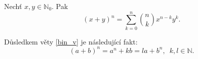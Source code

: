 \begin{veta}\label{bin_v}
  Nechť $x,y \in \mathbb N_0$. Pak
  $$(x+y)^n=\sum_{k=0}^n \binom{n}{k}x^{n-k}y^k.$$
\end{veta}

\begin{dusledek}
  Důsledkem věty \ref{bin_v} je následující fakt:
  \[
    (a+b)^n=a^n+kb=la+b^n,\,\,\, k,l\in \mathbb N.
  \]
\end{dusledek}

\begin{comment}


\begin{example}[SÚM 140/272]
  Dokažte, že platí vztah $n=\displaystyle\frac{ab}{d},$ kde $a,b\in \mathbb N$ a $d = D(a,b),$ $n=n(a,b).$
  \rm
  \begin{equation*}
    n=\displaystyle\frac{ab}{d}\iff nd=ab
  \end{equation*}
  Označme $a=da^\prime, b=db^\prime,$ kde $D(a^\prime, b^\prime)=1$. Pak
  \[
    ab=da^\prime b^\prime = d(a^\prime b^\prime d) = dn.
  \]
\end{example}


\begin{example}[SÚM 141/273]
  Nejmenší společný násobek čísla 21900 a trojciferného čísla $x$ je 13140. Určete číslo $x$.

  \rm
  Označme $a=2190=da^\prime$, $x=dx^\prime$ je hledané trojciferné číslo a $d = D(a,x),$ navíc platí $D(a^\prime,x^\prime)=1.$ Potom platí
  \begin{align*}
     ax&=nd \\
     a^\prime dx^\prime d &= nd\\
    n&=da^\prime x ^\prime = 13140 \implies x ^\prime= \displaystyle\frac{13140}{2190}=6 \\
    a^\prime d & = 2190
  \end{align*}
  Rozložme číslo 2190 na součin prvočinitelů.
  \[
    2190=2\cdot 3 \cdot 5\cdot 73
  \]
  Aby byla splněna podmínka $D(a^\prime, x^\prime)=1$, číslo $a^\prime$ nesmí být násobek čísel $2,3$, a proto musí být jejich násobek číslo $d$ (tzn. $d$ je násobek šesti). Navíc, aby bylo číslo $x$ trojciferné, musí platit $17 \leq d \leq 166.$ Aby byly obě podmínky splněny, musí jedině $d=30$. Potom $x=180.$
\end{example}
\end{comment}
